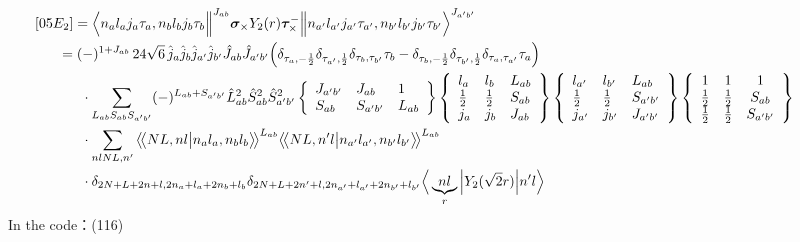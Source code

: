 \documentclass[master]{shnuthesis}
\newcommand{\llangle}{\big\langle\!\big\langle}
\newcommand{\rrangle}{\big\rangle\!\big\rangle}
\newcommand{\ap}{a^\prime}
\newcommand{\bp}{b^\prime}
\newcommand{\il}{\!\!\!\!\!\!\!\!\!\!}
\newcommand{\ii}{\!\!\!\!\!\!\!\!\!\!\!\!\!\!\!\!\!\!\!\!}
\begin{document}
\begin{align}
    &\ii [05E_2] = \Big\langle n_a l_a j_a \tau_a, n_b l_b j_b \tau_b \Big\|^{J_{ab}} \bm{\sigma}_\times Y_2(r) \bm{\tau}_\times^- \Big\| n_{\ap} l_{\ap} j_{\ap} \tau_{\ap}, n_{\bp} l_{\bp} j_{\bp} \tau_{\bp} \Big\rangle^{J_{\ap \bp}} \\
    &\il = (-)^{1+J_{ab}}\,24\sqrt{6}\,\hat{j}_a\hat{j}_b\hat{j}_{\ap}\hat{j}_{\bp}\hat{J}_{ab}\hat{J}_{\ap\bp} \Big( \delta_{\tau_a,-\frac{1}{2}}\delta_{\tau_{\ap},\frac{1}{2}}\delta_{\tau_b,\tau_{\bp}}\tau_b - \delta_{\tau_b,-\frac{1}{2}}\delta_{\tau_{\bp},\frac{1}{2}}\delta_{\tau_a,\tau_{\ap}}\tau_a \Big) \notag\\
    & \cdot \sum_{L_{ab}S_{ab}S_{\ap\bp}} (-)^{L_{ab}+S_{\ap\bp}} \hat{L}_{ab}^2\hat{S}_{ab}^2\hat{S}_{\ap\bp}^2  \left\{\begin{array}{lll} J_{\ap\bp} & J_{ab} & 1 \\ S_{ab} & S_{\ap\bp} & L_{ab} \end{array}\right\}  \left\{\begin{array}{lll}l_{a} & l_{b} & L_{ab} \\ \frac{1}{2} & \frac{1}{2} & S_{ab} \\j_{a} & j_{b} & J_{ab} \end{array}\right\} \left\{\begin{array}{lll}l_{\ap} & l_{\bp} & L_{ab} \\ \frac{1}{2} & \frac{1}{2} & S_{\ap\bp} \\j_{\ap} & j_{\bp} & J_{\ap\bp} \end{array}\right\}  \left\{\begin{array}{ccc} 1 & 1 & 1 \\ \frac{1}{2} & \frac{1}{2} & S_{ab} \\ \frac{1}{2} & \frac{1}{2} & S_{\ap\bp} \end{array}\right\}  \notag \\
    & \cdot \sum_{nlNL,n^\prime} \llangle N L, n l \big| n_{a} l_{a}, n_{b} l_{b} \rrangle^{L_{ab}} \llangle N L, n^\prime l \big| n_{a^\prime} l_{a^\prime}, n_{b^\prime} l_{b^\prime} \rrangle^{L_{ab}} \notag\\
    & \cdot \delta_{2N+L+2n+l,2n_a+l_a+2n_b+l_b}\delta_{2N+L+2n^\prime+l,2n_{a^\prime}+l_{a^\prime}+2n_{b^\prime}+l_{b^\prime}}  \Big\langle \underbrace{n l}_{r} \Big| Y_2(\sqrt{2}r) \Big| n^\prime l \Big\rangle
\end{align}
In the code：(116)
\end{document}
